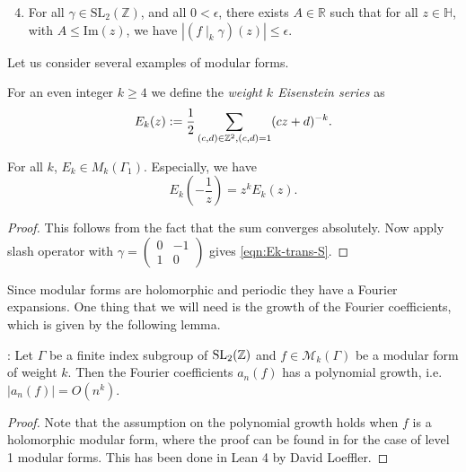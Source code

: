 \begin{enumerate}
	 \setcounter{enumi}{3}
	\item  For all $\gamma \in \mathrm{SL}_2(\mathbb{Z})$, and all  $0 < \epsilon$, there exists $A \in \mathbb{R}$ such that for all $z \in \mathbb{H}$, with $ A \le \mathrm{Im}(z)$, we have $|(f \mid_k \gamma) (z) |\le \epsilon$.
\end{enumerate}


Let us consider several examples of modular forms.
\begin{definition}\label{def:Ek}\leanok
For an even integer $k\geq 4$ we define the \emph{weight $k$ Eisenstein series} as
\begin{equation}\label{eqn:Ek-definition}
E_k(z):=\frac{1}{2}\sum_{(c,d)\in\mathbb{Z}^2, (c,d)=1}(cz+d)^{-k}.\end{equation}
\end{definition}
\begin{lemma}\label{lemma:Ek-is-modular-form}
For all $k$, $E_k\in M_k(\Gamma_1)$.
Especially, we have
\begin{equation}\label{eqn:Ek-trans-S}
    E_k \left(-\frac{1}{z}\right) = z^k E_k(z).
\end{equation}
\end{lemma}
\begin{proof}
    \leanok
This follows from the fact that the sum converges absolutely.
Now apply slash operator with $\gamma = \left(\begin{smallmatrix} 0 & -1 \\ 1 & 0 \end{smallmatrix}\right)$ gives \eqref{eqn:Ek-trans-S}.
\end{proof}

Since modular forms are holomorphic and periodic they have a Fourier expansions. One thing that we
will need is the growth of the Fourier coefficients, which is given by the following lemma.

\begin{lemma}\label{lemma:mod_form_poly_growth}\leanok : Let $\Gamma$ be a finite index subgroup of $\mathrm{SL}_2(\mathbb{Z})$ and $f \in \mathcal{M}_k(\Gamma)$ be a modular form of weight $k$. Then the Fourier coefficients $a_n(f)$ has a polynomial growth, i.e. $|a_n(f)| = O(n^k)$.
\end{lemma}

\begin{proof}\leanok
Note that the assumption on the polynomial growth holds when $f$ is a holomorphic modular form, where the proof can be found in \cite[p. 94]{Serre73} for the case of level 1 modular forms. This has been done in Lean 4 by David Loeffler.
\end{proof}


